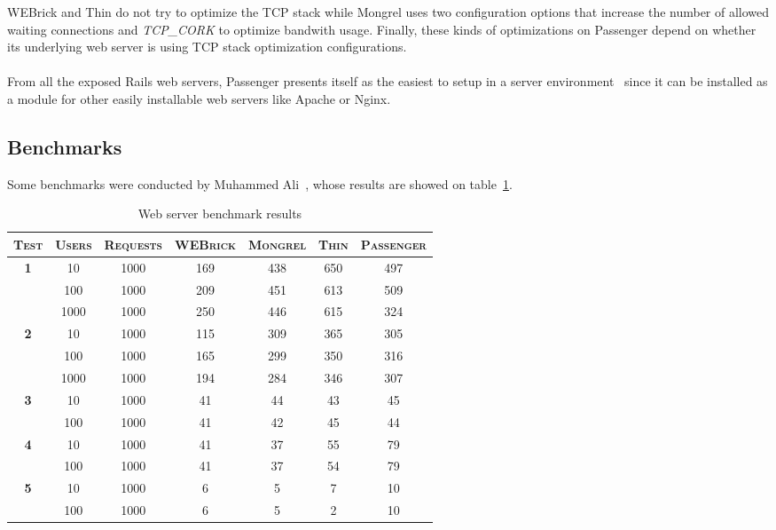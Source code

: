 WEBrick and Thin do not try to optimize the TCP stack while Mongrel uses two configuration options that increase the number of allowed waiting connections and \textit{TCP\_CORK} to optimize bandwith usage. Finally, these kinds of optimizations on Passenger depend on whether its underlying web server is using TCP stack optimization configurations.\\\\%
From all the exposed Rails web servers, Passenger presents itself as the easiest to setup in a server environment~\cite{ruby_webservers} since it can be installed as a module for other easily installable web servers like Apache or Nginx.

\subsection{Benchmarks}
Some benchmarks were conducted by Muhammed Ali~\cite{ruby_webservers}, whose results are showed on table~\ref{tab:webserver_benchmarks}.
\begin{table}[h!t]
  \centering
  
  \begin{tabular}{c|c|c|c|c|c|c}
    \textsc{\textbf{Test}} & \textsc{\textbf{Users}} & \textsc{\textbf{Requests}} & \textsc{\textbf{WEBrick}} & \textsc{\textbf{Mongrel}} & \textsc{\textbf{Thin}} & \textsc{\textbf{Passenger}} \\
  \hline

  \multirow{3}{*}{\textbf{1}}
  & 10 & 1000 & 169 & 438 & 650 & 497\\
  & 100 & 1000 & 209 & 451 & 613 & 509\\
  & 1000 & 1000 & 250 & 446 & 615 & 324\\
  \hline
    
  \multirow{3}{*}{\textbf{2}}
  & 10 & 1000 & 115 & 309 & 365 & 305\\
  & 100 & 1000 & 165 & 299 & 350 & 316\\
  & 1000 & 1000 & 194 & 284 & 346 & 307\\
  \hline
  
  \multirow{2}{*}{\textbf{3}}
  & 10 & 1000 & 41 & 44 & 43 & 45\\
  & 100 & 1000 & 41 & 42 & 45 & 44\\
  \hline

  \multirow{2}{*}{\textbf{4}}
  & 10 & 1000 & 41 & 37 & 55 & 79\\
  & 100 & 1000 & 41 & 37 & 54 & 79\\
  \hline
  
  \multirow{2}{*}{\textbf{5}}
  & 10 & 1000 & 6 & 5 & 7 & 10\\
  & 100 & 1000 & 6 & 5 & 2 & 10\\
  
  \end{tabular}
  \caption{Web server benchmark results}
  \label{tab:webserver_benchmarks}
\end{table}
